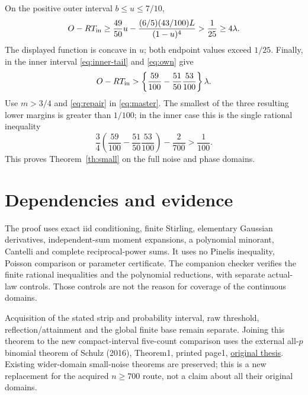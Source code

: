 \documentclass[11pt]{article}
\begin{document}
On the positive outer interval $b\le u\le7/10$,
\[
 O-RT_{\rm in}\ge\frac{49}{50}u-
                  \frac{(6/5)(43/100)L}{(1-u)^4}>\frac1{25}\ge4\lambda.
\]
The displayed function is concave in $u$; both endpoint values exceed $1/25$.
Finally, in the inner interval \eqref{eq:inner-tail} and \eqref{eq:own} give
\[
 O-RT_{\rm in}>
   \left\{\frac{59}{100}-\frac{51}{50}\frac{53}{100}\right\}\lambda.
\]
Use $m>3/4$ and \eqref{eq:repair} in \eqref{eq:master}.
The smallest of the three resulting lower margins is greater than $1/100$;
in the inner case this is the single rational inequality
\[
 \frac34\left(\frac{59}{100}-\frac{51}{50}\frac{53}{100}\right)
                     -\frac2{700}>\frac1{100}.
\]
This proves Theorem~\ref{th:small} on the full noise and phase domains.

\section*{Dependencies and evidence}
The proof uses exact iid conditioning, finite Stirling, elementary Gaussian
derivatives, independent-sum moment expansions, a polynomial minorant,
Cantelli and complete reciprocal-power sums. It uses no Pinelis inequality,
Poisson comparison or parameter certificate. The companion checker verifies
the finite rational inequalities and the polynomial reductions, with
separate actual-law controls. Those controls are not the reason for coverage
of the continuous domains.

Acquisition of the stated strip and probability interval, raw threshold,
reflection/attainment and the global finite base remain separate. Joining
this theorem to the new compact-interval five-count comparison uses the
external all-$p$ binomial theorem of Schulz (2016), Theorem1, printed page1,
\href{https://d-nb.info/1197702695/34}{original thesis}. Existing wider-domain
small-noise theorems are preserved; this is a new replacement for the
acquired $n\ge700$ route, not a claim about all their original domains.
\end{document}

